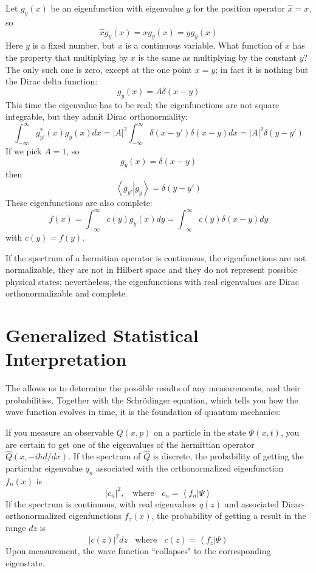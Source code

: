 \documentclass[12pt, a4paper, oneside, openright, titlepage]{book}
\newcommand{\braket}[2]{\left\langle#1\right\vert\left.#2\right\rangle}
\begin{document}
\begin{eg}
    Let $g_y(x)$ be an eigenfunction with eigenvalue $y$ for the position operator $\hat{x} = x$, so $$\hat{x}g_y(x) = xg_y(x) = yg_y(x)$$ Here $y$ is a fixed number, but $x$ is a continuous variable. What function of $x$ has the property that multiplying by $x$ is the same as multiplying by the constant $y$? The only such one is zero, except at the one point $x = y$; in fact it is nothing but the Dirac delta function: $$g_y(x) = A\delta(x-y)$$ This time the eigenvalue has to be real; the eigenfunctions are not square integrable, but they admit Dirac orthonormality: $$\int_{-\infty}^{\infty}g^*_{y'}(x)g_y(x)dx = |A|^2\int_{-\infty}^{\infty}\delta(x-y')\delta(x-y)dx = |A|^2\delta(y-y')$$ If we pick $A = 1$, so $$g_y(x) = \delta(x-y)$$ then $$\braket{g_{y'}}{g_y} = \delta(y-y')$$
    These eigenfunctions are also complete: $$f(x) = \int_{-\infty}^{\infty}c(y)g_y(x)dy = \int_{-\infty}^{\infty}c(y)\delta(x-y)dy$$
    with $c(y) = f(y)$.
\end{eg}

If the spectrum of a hermitian operator is continuous, the eigenfunctions are not normalizable, they are not in Hilbert space and they do not represent possible physical states; nevertheless, the eigenfunctions with real eigenvalues are Dirac orthonormalizable and complete.

\section{Generalized Statistical Interpretation}

The  allows us to determine the possible results of any measurements, and their probabilities. Together with the Schr\"{o}dinger equation, which tells you how the wave function evolves in time, it is the foundation of quantum mechanics:

\begin{namthm}
    If you measure an observable $Q(x,p)$ on a particle in the state $\Psi(x,t)$, you are certain to get one of the eigenvalues of the hermittian operator $\hat{Q}(x,-i\hbar d/dx)$. If the spectrum of $\hat{Q}$ is discrete, the probability of getting the particular eigenvalue $q_n$ associated with the orthonormalized eigenfunction $f_n(x)$ is $$|c_n|^2,\;\;\text{ where }\;\; c_n = \braket{f_n}{\Psi}$$
    If the spectrum is continuous, with real eigenvalues $q(z)$ and associated Dirac-orthonormalized eigenfunctions $f_z(x)$, the probability of getting a result in the range $dz$ is $$|c(z)|^2dz \;\;\text{ where }\;\;c(z) = \braket{f_z}{\Psi}$$
    Upon measurement, the wave function ``collapses" to the corresponding eigenstate.
\end{namthm}
\end{document}
